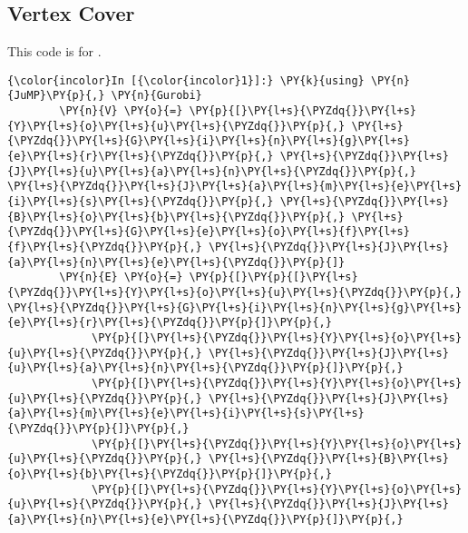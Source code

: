 

    






    

%
   
   \subsection{Vertex Cover}
\label{code:vertex-cover}
This code is for .

    \begin{Verbatim}[commandchars=\\\{\}]
{\color{incolor}In [{\color{incolor}1}]:} \PY{k}{using} \PY{n}{JuMP}\PY{p}{,} \PY{n}{Gurobi}
        \PY{n}{V} \PY{o}{=} \PY{p}{[}\PY{l+s}{\PYZdq{}}\PY{l+s}{Y}\PY{l+s}{o}\PY{l+s}{u}\PY{l+s}{\PYZdq{}}\PY{p}{,} \PY{l+s}{\PYZdq{}}\PY{l+s}{G}\PY{l+s}{i}\PY{l+s}{n}\PY{l+s}{g}\PY{l+s}{e}\PY{l+s}{r}\PY{l+s}{\PYZdq{}}\PY{p}{,} \PY{l+s}{\PYZdq{}}\PY{l+s}{J}\PY{l+s}{u}\PY{l+s}{a}\PY{l+s}{n}\PY{l+s}{\PYZdq{}}\PY{p}{,} \PY{l+s}{\PYZdq{}}\PY{l+s}{J}\PY{l+s}{a}\PY{l+s}{m}\PY{l+s}{e}\PY{l+s}{i}\PY{l+s}{s}\PY{l+s}{\PYZdq{}}\PY{p}{,} \PY{l+s}{\PYZdq{}}\PY{l+s}{B}\PY{l+s}{o}\PY{l+s}{b}\PY{l+s}{\PYZdq{}}\PY{p}{,} \PY{l+s}{\PYZdq{}}\PY{l+s}{G}\PY{l+s}{e}\PY{l+s}{o}\PY{l+s}{f}\PY{l+s}{f}\PY{l+s}{\PYZdq{}}\PY{p}{,} \PY{l+s}{\PYZdq{}}\PY{l+s}{J}\PY{l+s}{a}\PY{l+s}{n}\PY{l+s}{e}\PY{l+s}{\PYZdq{}}\PY{p}{]}
        \PY{n}{E} \PY{o}{=} \PY{p}{[}\PY{p}{[}\PY{l+s}{\PYZdq{}}\PY{l+s}{Y}\PY{l+s}{o}\PY{l+s}{u}\PY{l+s}{\PYZdq{}}\PY{p}{,} \PY{l+s}{\PYZdq{}}\PY{l+s}{G}\PY{l+s}{i}\PY{l+s}{n}\PY{l+s}{g}\PY{l+s}{e}\PY{l+s}{r}\PY{l+s}{\PYZdq{}}\PY{p}{]}\PY{p}{,}
             \PY{p}{[}\PY{l+s}{\PYZdq{}}\PY{l+s}{Y}\PY{l+s}{o}\PY{l+s}{u}\PY{l+s}{\PYZdq{}}\PY{p}{,} \PY{l+s}{\PYZdq{}}\PY{l+s}{J}\PY{l+s}{u}\PY{l+s}{a}\PY{l+s}{n}\PY{l+s}{\PYZdq{}}\PY{p}{]}\PY{p}{,} 
             \PY{p}{[}\PY{l+s}{\PYZdq{}}\PY{l+s}{Y}\PY{l+s}{o}\PY{l+s}{u}\PY{l+s}{\PYZdq{}}\PY{p}{,} \PY{l+s}{\PYZdq{}}\PY{l+s}{J}\PY{l+s}{a}\PY{l+s}{m}\PY{l+s}{e}\PY{l+s}{i}\PY{l+s}{s}\PY{l+s}{\PYZdq{}}\PY{p}{]}\PY{p}{,}
             \PY{p}{[}\PY{l+s}{\PYZdq{}}\PY{l+s}{Y}\PY{l+s}{o}\PY{l+s}{u}\PY{l+s}{\PYZdq{}}\PY{p}{,} \PY{l+s}{\PYZdq{}}\PY{l+s}{B}\PY{l+s}{o}\PY{l+s}{b}\PY{l+s}{\PYZdq{}}\PY{p}{]}\PY{p}{,}
             \PY{p}{[}\PY{l+s}{\PYZdq{}}\PY{l+s}{Y}\PY{l+s}{o}\PY{l+s}{u}\PY{l+s}{\PYZdq{}}\PY{p}{,} \PY{l+s}{\PYZdq{}}\PY{l+s}{J}\PY{l+s}{a}\PY{l+s}{n}\PY{l+s}{e}\PY{l+s}{\PYZdq{}}\PY{p}{]}\PY{p}{,}

\end{Verbatim}
